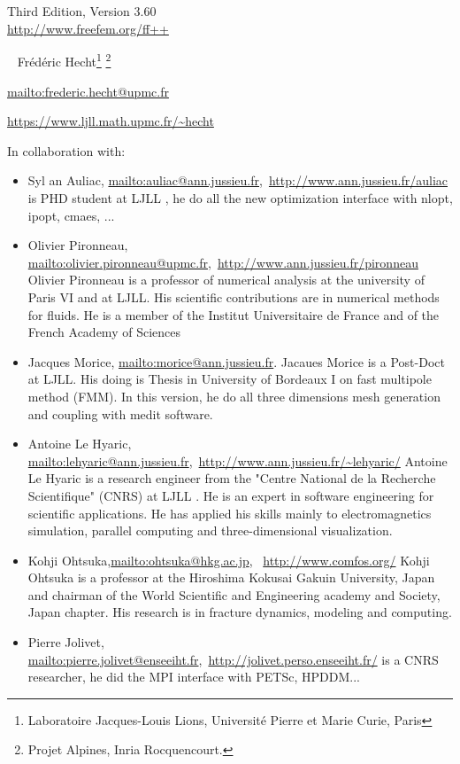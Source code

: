 \documentclass[a4paper,twoside,12pt]{book}
\def\VERSION{3.60}
\begin{document}
\begin{center}
 {} \\ \vglue 0.0cm  ~ \\
   Third Edition, Version \VERSION
 \\ \vglue 0.7cm
 {\Large \url{http://www.freefem.org/ff++}} \\
\vglue 0.5cm

 \
{ Fr\'{e}d\'{e}ric Hecht\footnote{Laboratoire Jacques-Louis Lions, Universit\'{e} Pierre et Marie Curie, Paris}
\footnote{Projet Alpines, Inria Rocquencourt.} }

\url{mailto:frederic.hecht@upmc.fr}

\url{https://www.ljll.math.upmc.fr/~hecht}


\bigskip

In collaboration with:
{\small
\begin{itemize}
\item {\normalsize Syl	an Auliac}, \url{mailto:auliac@ann.jussieu.fr},~\url{http://www.ann.jussieu.fr/auliac}
{is PHD student at LJLL  , he do all the new optimization interface with nlopt, ipopt, cmaes, ...}

\item {\normalsize Olivier Pironneau}, \url{mailto:olivier.pironneau@upmc.fr},~\url{http://www.ann.jussieu.fr/pironneau}
{Olivier Pironneau is a professor of numerical analysis at the university of Paris VI and at LJLL.  His scientific contributions are in numerical methods for fluids.  He is a member of the Institut Universitaire de France and of the French  Academy of Sciences}
\item {\normalsize Jacques Morice}, \url{mailto:morice@ann.jussieu.fr}.
Jacaues Morice is a Post-Doct at LJLL. His doing is Thesis in University of Bordeaux I on fast multipole method (FMM).
In this version, he do all three dimensions mesh generation and coupling with medit software.
\item {\normalsize Antoine Le Hyaric}, \url{mailto:lehyaric@ann.jussieu.fr},~\url{http://www.ann.jussieu.fr/~lehyaric/}
{Antoine Le Hyaric}{ is a research engineer  from the "Centre National de la
Recherche Scientifique" (CNRS) at LJLL . He is an expert in software engineering
for scientific applications. He has applied his skills mainly to
electromagnetics simulation, parallel computing and three-dimensional
visualization.}
\item {\normalsize Kohji Ohtsuka},\url{mailto:ohtsuka@hkg.ac.jp},~ \url{http://www.comfos.org/}
{Kohji Ohtsuka}{ is a professor at the Hiroshima Kokusai Gakuin University, Japan and chairman of the World Scientific and Engineering academy and Society, Japan chapter.  His research is in fracture dynamics, modeling and computing.}
\item {\normalsize Pierre  Jolivet}, \url{mailto:pierre.jolivet@enseeiht.fr},~\url{http://jolivet.perso.enseeiht.fr/}
{is a CNRS researcher, he did the MPI interface with PETSc, HPDDM...}

\end{itemize}}
\end{center}
\end{document}
